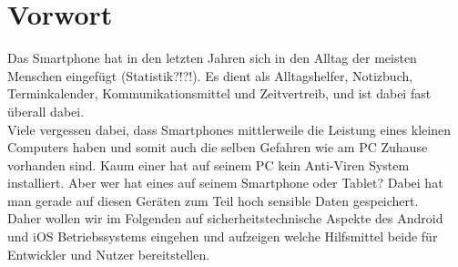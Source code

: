 \section{Vorwort}
Das Smartphone hat in den letzten Jahren sich in den Alltag der meisten Menschen eingefügt (Statistik?!?!). Es dient als Alltagshelfer, Notizbuch, Terminkalender, Kommunikationsmittel und Zeitvertreib, und ist dabei fast überall dabei.\\
Viele vergessen dabei, dass Smartphones mittlerweile die Leistung eines kleinen Computers haben und somit auch die selben Gefahren wie am PC Zuhause vorhanden sind.
Kaum einer hat auf seinem PC kein Anti-Viren System installiert. Aber wer hat eines auf seinem Smartphone oder Tablet? Dabei hat man gerade auf diesen Geräten zum Teil hoch sensible Daten gespeichert.\\
Daher wollen wir im Folgenden auf sicherheitstechnische Aspekte des Android und iOS Betriebssystems eingehen und aufzeigen welche Hilfsmittel beide für Entwickler und Nutzer bereitstellen.